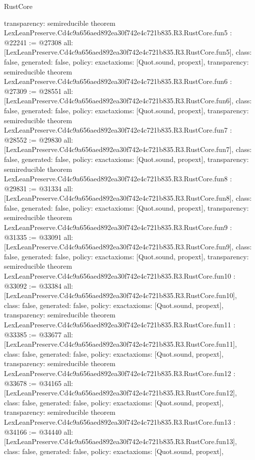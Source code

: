 \begin{lexlean}{RustCore}
\begin{coremodule}
{  transparency: semireducible
}
theorem LexLeanPreserve.Cd4c9a656aed892ea30f742e4c721b835.R3.RustCore.fun5 : @22241 := @27308 {
  all: [LexLeanPreserve.Cd4c9a656aed892ea30f742e4c721b835.R3.RustCore.fun5],
  class: false,
  generated: false,
  policy: exact{axioms: [Quot.sound, propext]},
  transparency: semireducible
}
theorem LexLeanPreserve.Cd4c9a656aed892ea30f742e4c721b835.R3.RustCore.fun6 : @27309 := @28551 {
  all: [LexLeanPreserve.Cd4c9a656aed892ea30f742e4c721b835.R3.RustCore.fun6],
  class: false,
  generated: false,
  policy: exact{axioms: [Quot.sound, propext]},
  transparency: semireducible
}
theorem LexLeanPreserve.Cd4c9a656aed892ea30f742e4c721b835.R3.RustCore.fun7 : @28552 := @29830 {
  all: [LexLeanPreserve.Cd4c9a656aed892ea30f742e4c721b835.R3.RustCore.fun7],
  class: false,
  generated: false,
  policy: exact{axioms: [Quot.sound, propext]},
  transparency: semireducible
}
theorem LexLeanPreserve.Cd4c9a656aed892ea30f742e4c721b835.R3.RustCore.fun8 : @29831 := @31334 {
  all: [LexLeanPreserve.Cd4c9a656aed892ea30f742e4c721b835.R3.RustCore.fun8],
  class: false,
  generated: false,
  policy: exact{axioms: [Quot.sound, propext]},
  transparency: semireducible
}
theorem LexLeanPreserve.Cd4c9a656aed892ea30f742e4c721b835.R3.RustCore.fun9 : @31335 := @33091 {
  all: [LexLeanPreserve.Cd4c9a656aed892ea30f742e4c721b835.R3.RustCore.fun9],
  class: false,
  generated: false,
  policy: exact{axioms: [Quot.sound, propext]},
  transparency: semireducible
}
theorem LexLeanPreserve.Cd4c9a656aed892ea30f742e4c721b835.R3.RustCore.fun10 : @33092 := @33384 {
  all: [LexLeanPreserve.Cd4c9a656aed892ea30f742e4c721b835.R3.RustCore.fun10],
  class: false,
  generated: false,
  policy: exact{axioms: [Quot.sound, propext]},
  transparency: semireducible
}
theorem LexLeanPreserve.Cd4c9a656aed892ea30f742e4c721b835.R3.RustCore.fun11 : @33385 := @33677 {
  all: [LexLeanPreserve.Cd4c9a656aed892ea30f742e4c721b835.R3.RustCore.fun11],
  class: false,
  generated: false,
  policy: exact{axioms: [Quot.sound, propext]},
  transparency: semireducible
}
theorem LexLeanPreserve.Cd4c9a656aed892ea30f742e4c721b835.R3.RustCore.fun12 : @33678 := @34165 {
  all: [LexLeanPreserve.Cd4c9a656aed892ea30f742e4c721b835.R3.RustCore.fun12],
  class: false,
  generated: false,
  policy: exact{axioms: [Quot.sound, propext]},
  transparency: semireducible
}
theorem LexLeanPreserve.Cd4c9a656aed892ea30f742e4c721b835.R3.RustCore.fun13 : @34166 := @34440 {
  all: [LexLeanPreserve.Cd4c9a656aed892ea30f742e4c721b835.R3.RustCore.fun13],
  class: false,
  generated: false,
  policy: exact{axioms: [Quot.sound, propext]},
}
\end{coremodule}
\end{lexlean}
